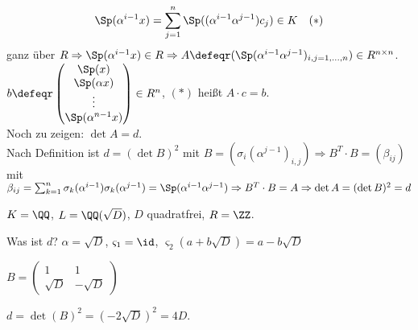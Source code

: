 \begin{Bew}
\[
\Sp(\alpha^{i-1} x) = \sum_{j=1}^n
\Sp((\alpha^{i-1}\alpha^{j-1})c_j) \in K \quad (*)
\]
ganz über $R
\Rightarrow \Sp(\alpha^{i-1}x) \in R \Rightarrow A \defeqr
(\Sp(\alpha^{i-1} \alpha^{j-1})_{i,j = 1, \dots, n}) \in R^{n \times n}$.\\
$b \defeqr \begin{pmatrix} \Sp(x)\\ \Sp(\alpha x)\\ \vdots \\
\Sp(\alpha^{n-1}x) \end{pmatrix} \in R^n$, $(*)$ heißt $A \cdot c = b$.\\
Noch zu zeigen: $\det A = d$.\\
Nach Definition ist $d = (\det B)^2$ mit $B = (\sigma_i(\alpha^{j-1})_{i,j})
\Rightarrow B^T \cdot B = (\beta_{ij})$ mit $\beta_{ij} = \sum_{k=1}^n
\sigma_k(\alpha^{i-1}) \sigma_k(\alpha^{j-1}) = \Sp(\alpha^{i-1}
\alpha^{j-1}) \Rightarrow B^T \cdot B = A \Rightarrow \det A = (\det B)^2 =
d$
\end{Bew}

\begin{nnBsp}
$K=\QQ$, $L=\QQ(\sqrt{D})$, $D$ quadratfrei, $R=\ZZ$.

Was ist $d$? $\alpha = \sqrt{D}$, $\varsigma_1=\id$, $\varsigma_2(a+b\sqrt{D})=a-b\sqrt{D}$

$B=\left(\begin{array}{cc}1&1\\\sqrt{D}&-\sqrt{D}\end{array}\right)$

$d=\det(B)^2=(-2\sqrt{D})^2=4D$.

\end{nnBsp}
